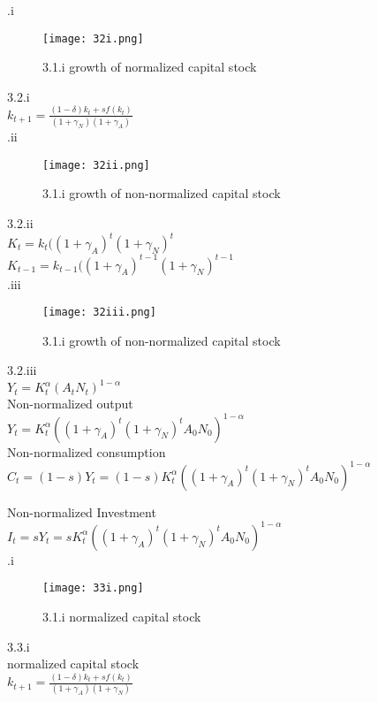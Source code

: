 \documentclass[12pt]{article}
\numberwithin{equation}{subsection} %
\begin{document}
.i\\
\begin{figure}[ht!]
\centering
\texttt{[image: 32i.png]}
\caption{3.1.i  growth of normalized capital stock\label{overflow}}
\end{figure}

3.2.i\\
$k_{t+1}=\frac {(1-\delta)k_{t}+sf(k_{t})}{(1+\gamma_{N})(1+\gamma_{A})}$\\






.ii\\
\begin{figure}[ht!]
\centering
\texttt{[image: 32ii.png]}
\caption{3.1.i  growth of non-normalized capital stock\label{overflow}}
\end{figure}
3.2.ii\\
$K_{t}=k_{t}((1+\gamma_{A})^{t}(1+\gamma_{N})^{t}$\\

$K_{t-1}=k_{t-1}((1+\gamma_{A})^{t-1}(1+\gamma_{N})^{t-1}$\\

.iii\\
\begin{figure}[ht!]
\centering
\texttt{[image: 32iii.png]}
\caption{3.1.i  growth of non-normalized capital stock\label{overflow}}
\end{figure}
3.2.iii\\
$Y_{t}=K_{t}^{\alpha}(A_{t}N_{t})^{1-\alpha}$\\

Non-normalized output\\
$Y_{t}=K_{t}^{\alpha}((1+\gamma_{A})^{t}(1+\gamma_{N})^{t}A_{0}N_{0})^{1-\alpha}$\\
Non-normalized consumption\\
$C_{t}=(1-s)Y_{t}=(1-s)K_{t}^{\alpha}((1+\gamma_{A})^{t}(1+\gamma_{N})^{t}A_{0}N_{0})^{1-\alpha}$


Non-normalized Investment\\
$I_{t}=sY_{t}=sK_{t}^{\alpha}((1+\gamma_{A})^{t}(1+\gamma_{N})^{t}A_{0}N_{0})^{1-\alpha}$\\


.i\\
\begin{figure}[ht!]
\centering
\texttt{[image: 33i.png]}
\caption{3.1.i  normalized capital stock\label{overflow}}
\end{figure}
3.3.i\\
normalized capital stock\\
$k_{t+1}=\frac{(1-\delta)k_{t}+sf(k_{t})}{(1+\gamma_{A})(1+\gamma_{N})}$\\
\end{document}
